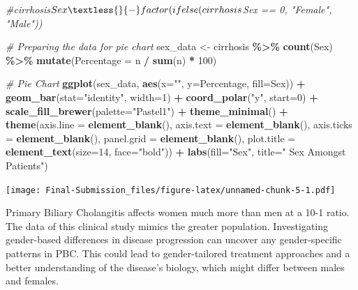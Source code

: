 \documentclass[
]{article}
\newenvironment{Shaded}{\begin{snugshade}}{\end{snugshade}}
\newcommand{\AttributeTok}[1]{\textcolor[rgb]{0.13,0.29,0.53}{#1}}
\newcommand{\CommentTok}[1]{\textcolor[rgb]{0.56,0.35,0.01}{\textit{#1}}}
\newcommand{\DecValTok}[1]{\textcolor[rgb]{0.00,0.00,0.81}{#1}}
\newcommand{\FunctionTok}[1]{\textcolor[rgb]{0.13,0.29,0.53}{\textbf{#1}}}
\newcommand{\NormalTok}[1]{#1}
\newcommand{\OtherTok}[1]{\textcolor[rgb]{0.56,0.35,0.01}{#1}}
\newcommand{\SpecialCharTok}[1]{\textcolor[rgb]{0.81,0.36,0.00}{\textbf{#1}}}
\newcommand{\StringTok}[1]{\textcolor[rgb]{0.31,0.60,0.02}{#1}}
\begin{document}
\begin{Shaded}
\begin{Highlighting}[]
\CommentTok{\#cirrhosis$Sex \textless{}{-} factor(ifelse(cirrhosis$Sex == 0, "Female", "Male"))}

\CommentTok{\# Preparing the data for pie chart}
\NormalTok{sex\_data }\OtherTok{\textless{}{-}}\NormalTok{ cirrhosis }\SpecialCharTok{\%\textgreater{}\%} 
            \FunctionTok{count}\NormalTok{(Sex) }\SpecialCharTok{\%\textgreater{}\%} 
            \FunctionTok{mutate}\NormalTok{(}\AttributeTok{Percentage =}\NormalTok{ n }\SpecialCharTok{/} \FunctionTok{sum}\NormalTok{(n) }\SpecialCharTok{*} \DecValTok{100}\NormalTok{)}

\CommentTok{\# Pie Chart}
\FunctionTok{ggplot}\NormalTok{(sex\_data, }\FunctionTok{aes}\NormalTok{(}\AttributeTok{x=}\StringTok{""}\NormalTok{, }\AttributeTok{y=}\NormalTok{Percentage, }\AttributeTok{fill=}\NormalTok{Sex)) }\SpecialCharTok{+}
    \FunctionTok{geom\_bar}\NormalTok{(}\AttributeTok{stat=}\StringTok{"identity"}\NormalTok{, }\AttributeTok{width=}\DecValTok{1}\NormalTok{) }\SpecialCharTok{+}
    \FunctionTok{coord\_polar}\NormalTok{(}\StringTok{"y"}\NormalTok{, }\AttributeTok{start=}\DecValTok{0}\NormalTok{) }\SpecialCharTok{+}
    \FunctionTok{scale\_fill\_brewer}\NormalTok{(}\AttributeTok{palette=}\StringTok{"Pastel1"}\NormalTok{) }\SpecialCharTok{+}
    \FunctionTok{theme\_minimal}\NormalTok{() }\SpecialCharTok{+}
    \FunctionTok{theme}\NormalTok{(}\AttributeTok{axis.line =} \FunctionTok{element\_blank}\NormalTok{(),}
          \AttributeTok{axis.text =} \FunctionTok{element\_blank}\NormalTok{(),}
          \AttributeTok{axis.ticks =} \FunctionTok{element\_blank}\NormalTok{(),}
          \AttributeTok{panel.grid =} \FunctionTok{element\_blank}\NormalTok{(),}
          \AttributeTok{plot.title =} \FunctionTok{element\_text}\NormalTok{(}\AttributeTok{size=}\DecValTok{14}\NormalTok{, }\AttributeTok{face=}\StringTok{"bold"}\NormalTok{)) }\SpecialCharTok{+}
    \FunctionTok{labs}\NormalTok{(}\AttributeTok{fill=}\StringTok{"Sex"}\NormalTok{, }\AttributeTok{title=}\StringTok{" Sex Amongst Patients"}\NormalTok{)}
\end{Highlighting}
\end{Shaded}

\texttt{[image: Final-Submission\_files/figure-latex/unnamed-chunk-5-1.pdf]}

Primary Biliary Cholangitis affects women much more than men at a 10-1
ratio. The data of this clinical study mimics the greater population.
Investigating gender-based differences in disease progression can
uncover any gender-specific patterns in PBC. This could lead to
gender-tailored treatment approaches and a better understanding of the
disease's biology, which might differ between males and females.
\end{document}
